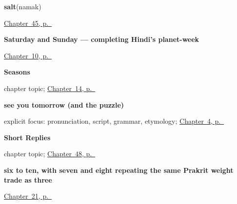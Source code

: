 \noindent\begin{minipage}[t]{\linewidth}
\raggedright
\textbf{salt}\enspace\emph{}\enspace(namak)\par
\footnotesize \hyperref[ch:hi-ask-for]{Chapter~45, p.~\pageref*{ch:hi-ask-for}}
\end{minipage}\par\smallskip

\noindent\begin{minipage}[t]{\linewidth}
\raggedright
\textbf{Saturday and Sunday — completing Hindi's planet-week}\enspace\emph{ }\par
\footnotesize \hyperref[ch:hi-days-of-the-week]{Chapter~10, p.~\pageref*{ch:hi-days-of-the-week}}
\end{minipage}\par\smallskip

\noindent\begin{minipage}[t]{\linewidth}
\raggedright
\textbf{Seasons}\par
\footnotesize chapter topic; \hyperref[ch:hi-seasons]{Chapter~14, p.~\pageref*{ch:hi-seasons}}
\end{minipage}\par\smallskip

\noindent\begin{minipage}[t]{\linewidth}
\raggedright
\textbf{see you tomorrow (and the  puzzle)}\enspace\emph{  }\par
\footnotesize explicit focus: pronunciation, script, grammar, etymology; \hyperref[ch:farewells]{Chapter~4, p.~\pageref*{ch:farewells}}
\end{minipage}\par\smallskip

\noindent\begin{minipage}[t]{\linewidth}
\raggedright
\textbf{Short Replies}\par
\footnotesize chapter topic; \hyperref[ch:hi-replies]{Chapter~48, p.~\pageref*{ch:hi-replies}}
\end{minipage}\par\smallskip

\noindent\begin{minipage}[t]{\linewidth}
\raggedright
\textbf{six to ten, with seven and eight repeating the same Prakrit weight trade as three}\enspace\emph{    }\par
\footnotesize \hyperref[ch:hi-numbers-six-to-ten]{Chapter~21, p.~\pageref*{ch:hi-numbers-six-to-ten}}
\end{minipage}\par\smallskip

